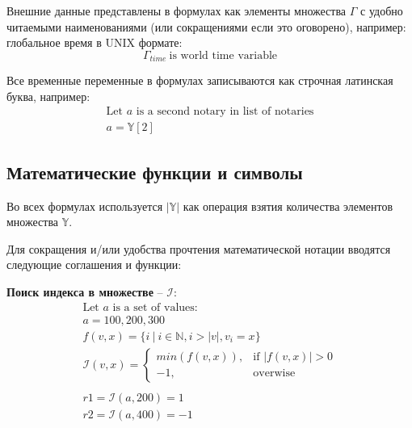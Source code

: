 \documentclass[12pt]{report}
\begin{document}
\begin{multicols}{2}
Внешние данные представлены в формулах как элементы множества $\Gamma$ с удобно читаемыми наименованиями (или сокращениями если это оговорено), например: глобальное время в UNIX формате:
\begin{equation}
\Gamma_{time} \ \text{is world time variable}
\end{equation}

Все временные переменные в формулах записываются как строчная латинская буква, например:
\begin{equation}
\begin{aligned}
\text{Let } a \text{ is a second notary in list of notaries} \\
a = \mathbb{Y}[2]
\end{aligned}
\end{equation}
\end{multicols}

\subsection{Математические функции и символы}
\label{tech-review-math}
Во всех формулах используется $|\mathbb{Y}|$ как операция взятия количества элементов множества $\mathbb{Y}$.

Для сокращения и/или удобства прочтения математической нотации вводятся следующие соглашения и функции:

\textbf{Поиск индекса в множестве} – $\mathcal{I}$:
\begin{equation}
\begin{aligned}
\text{Let } a \text{ is a set of values: } \\
a = {100, 200, 300} \\
f(v, x) = \{i \ | \ i \in \mathbb{N},  i > |v|, v_i = x \} \\
\mathcal{I}(v, x) = \begin{cases}
	min(f(v,x)), & \text{if } |f(v, x)| > 0 \\
	-1, & \text{overwise}
\end{cases}
\\
\\
r1 = \mathcal{I}(a, 200) = 1 \\
r2 = \mathcal{I}(a, 400) = -1 \\
\end{aligned}
\end{equation}
\end{document}
